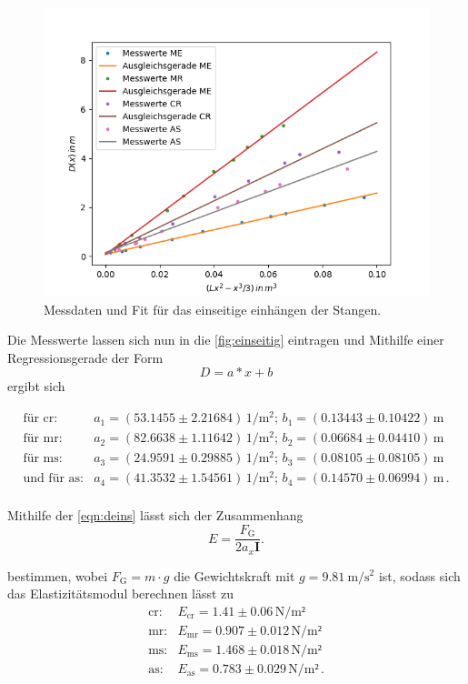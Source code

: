 \begin{figure}[H]
	\centering
	\includegraphics{Daten/AS1.png}
	\caption{Messdaten und Fit für das einseitige einhängen der Stangen.}
	\label{fig:einseitig}
\end{figure}

\noindent
Die Messwerte lassen sich nun in die \autoref{fig:einseitig} eintragen und Mithilfe einer Regressionsgerade der Form $$ D = a*x + b$$ ergibt sich

\begin{align*}
    \text{für cr}:& a_1 = (53.1455 \pm 2.21684) \, \si{1\per\meter^2} ; \, b_1 = (0.13443\pm 0.10422) \, \si{\meter}  \\
    \text{für mr}:& a_2 = (82.6638 \pm 1.11642 ) \, \si{1\per\meter^2} ;\, b_2 = (0.06684\pm 0.04410) \, \si{\meter}  \\
    \text{für ms}:& a_3 = (24.9591 \pm 0.29885) \, \si{1\per\meter^2} ; \, b_3 = (0.08105\pm 0.08105) \, \si{\meter}  \\
\text{und für as}:& a_4 = (41.3532 \pm 1.54561) \, \si{1\per\meter^2} ;\,  b_4 = (0.14570\pm 0.06994) \, \si{\meter} \, .\\
\end{align*} 

\noindent
Mithilfe der \autoref{eqn:deins} lässt sich der Zusammenhang
\begin{equation*}
    E = \frac{F_\text{G}}{2a_x\symbf{I}}.
\end{equation*}

\noindent
bestimmen, wobei $F_\text{G}= m \cdot g$ die Gewichtskraft mit $g = \SI{9.81}{\meter\per\second\squared}$ ist, sodass sich das Elastizitätsmodul berechnen lässt zu 
\begin{align*}
    \text{cr}:& E_\text{cr} =1.41 \pm 0.06    \, \si{\newton\per\meter²}\\
    \text{mr}:& E_\text{mr} = 0.907 \pm 0.012 \, \si{\newton\per\meter²}\\
    \text{ms}:& E_\text{ms} = 1.468 \pm 0.018 \, \si{\newton\per\meter²}\\
    \text{as}:& E_\text{as} = 0.783\pm 0.029  \, \si{\newton\per\meter²} \, .\\
\end{align*} 

